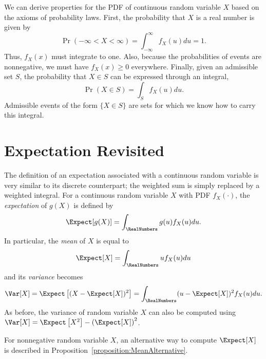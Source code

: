 We can derive properties for the PDF of continuous random variable $X$ based on the axioms of probability laws.
First, the probability that $X$ is a real number is given by
\begin{equation*}
\Pr (-\infty < X < \infty) = \int_{-\infty}^{\infty} f_X (u) du = 1.
\end{equation*}
Thus, $f_X (x)$ must integrate to one.
Also, because the probabilities of events are nonnegative, we must have $f_X (x) \geq 0$ everywhere.
Finally, given an admissible set $S$, the probability that $X \in S$ can be expressed through an integral,
\begin{equation*}
\Pr (X \in S) = \int_S f_X (u) du .
\end{equation*}
Admissible events of the form $\{ X \in S \}$ are sets for which we know how to carry this integral.


\section{Expectation Revisited}

The definition of an expectation associated with a continuous random variable is very similar to its discrete counterpart;
the weighted sum is simply replaced by a weighted integral.
For a continuous random variable $X$ with PDF $f_X(\cdot)$, the \emph{expectation} of $g(X)$ is defined by 
\begin{equation*}
\Expect [g(X)]
= \int_{\RealNumbers} g(u) f_X (u) du .
\end{equation*}
In particular, the \emph{mean} of $X$ is equal to 
\begin{equation*}
\Expect [X]
= \int_{\RealNumbers} u f_X (u) du
\end{equation*}
and its \emph{variance} becomes 
\begin{equation*}
\Var [X] = \Expect \left[ (X - \Expect[X])^2 \right]
= \int_{\RealNumbers} (u - \Expect[X])^2 f_X (u) du .
\end{equation*}
As before, the variance of random variable $X$ can also be computed using $\Var [X] = \Expect \left[ X^2 \right] - \left( \Expect [X] \right)^2$.



For nonnegative random variable $X$, an alternative way to compute $\Expect [X]$ is described in Proposition~\ref{proposition:MeanAlternative}. 

